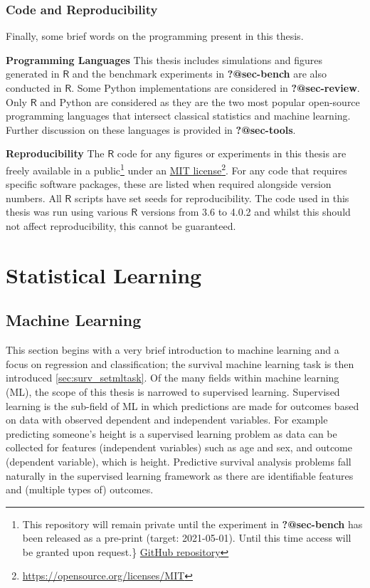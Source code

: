 \documentclass[
  letterpaper,
]{scrbook}
\theoremstyle{plain}
\theoremstyle{definition}
\theoremstyle{remark}
\begin{document}
\hypertarget{code-and-reproducibility}{%
\subsection{Code and Reproducibility}\label{code-and-reproducibility}}

Finally, some brief words on the programming present in this thesis.

\textbf{Programming Languages} This thesis includes simulations and
figures generated in \(\textsf{R}\) and the benchmark experiments in
\textbf{?@sec-bench} are also conducted in \(\textsf{R}\). Some Python
implementations are considered in \textbf{?@sec-review}. Only
\(\textsf{R}\) and Python are considered as they are the two most
popular open-source programming languages that intersect classical
statistics and machine learning. Further discussion on these languages
is provided in \textbf{?@sec-tools}.

\textbf{Reproducibility} The \(\textsf{R}\) code for any figures or
experiments in this thesis are freely available in a public\footnote{This
  repository will remain private until the experiment in
  \textbf{?@sec-bench} has been released as a pre-print (target:
  2021-05-01). Until this time access will be granted upon request.\}
  \href{https://github.com/RaphaelS1/thesis_supplementary}{GitHub
  repository}\footnotemark{}} under an
\href{https://opensource.org/licenses/MIT}{MIT license}\footnote{\url{https://opensource.org/licenses/MIT}}.
For any code that requires specific software packages, these are listed
when required alongside version numbers. All \(\textsf{R}\) scripts have
set seeds for reproducibility. The code used in this thesis was run
using various \(\textsf{R}\) versions from 3.6 to 4.0.2 and whilst this
should not affect reproducibility, this cannot be guaranteed.


\hypertarget{statistical-learning}{%
\chapter{Statistical Learning}\label{statistical-learning}}

\section{Machine Learning}
\label{sec:surv_setml}

This section begins with a very brief introduction to machine learning
and a focus on regression and classification; the survival machine
learning task is then introduced \ref{sec:surv_setmltask}. Of the many
fields within machine learning (ML), the scope of this thesis is
narrowed to supervised learning. Supervised learning is the sub-field of
ML in which predictions are made for outcomes based on data with
observed dependent and independent variables. For example predicting
someone's height is a supervised learning problem as data can be
collected for features (independent variables) such as age and sex, and
outcome (dependent variable), which is height. Predictive survival
analysis problems fall naturally in the supervised learning framework as
there are identifiable features and (multiple types of) outcomes.
\end{document}
